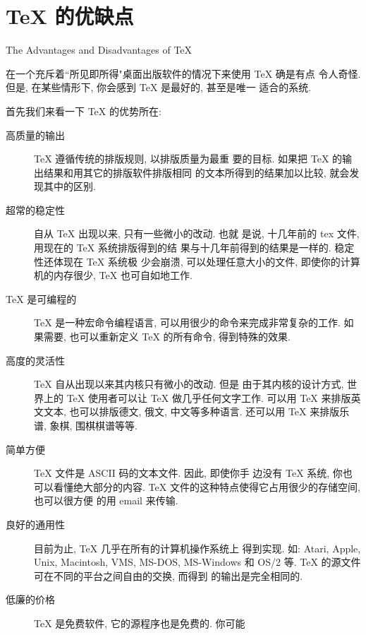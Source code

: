 \chapter{\TeX{} 的优缺点}{The Advantages and Disadvantages of \TeX}

在一个充斥着``所见即所得"桌面出版软件的情况下来使用 \TeX{} \index{\TeX} 确是有点
令人奇怪. 但是, 在某些情形下, 你会感到 \TeX{} \index{\TeX} 是最好的, 甚至是唯一
适合的系统.

首先我们来看一下 \TeX{} \index{\TeX} 的优势所在:

\begin{description}
  \item[高质量的输出] \TeX{} \index{\TeX} 遵循传统的排版规则, 以排版质量为最重
       要的目标. 如果把 \TeX{} \index{\TeX} 的输出结果和用其它的排版软件排版相同
       的文本所得到的结果加以比较, 就会发现其中的区别.
  \item[超常的稳定性] 自从 \TeX{} \index{\TeX} 出现以来, 只有一些微小的改动. 也就
       是说, 十几年前的 tex 文件, 用现在的 \TeX{} \index{\TeX}  系统排版得到的结
       果与十几年前得到的结果是一样的. 稳定性还体现在 \TeX{} \index{\TeX} 系统极
       少会崩溃, 可以处理任意大小的文件, 即使你的计算机的内存很少,
       \TeX{} \index{\TeX} 也可自如地工作.
  \item[\TeX{} 是可编程的] \TeX{} \index{\TeX} 是一种宏命令编程语言,
       可以用很少的命令来完成非常复杂的工作. 如果需要, 也可以重新定义
       \TeX{} \index{\TeX} 的所有命令, 得到特殊的效果.
  \item[高度的灵活性] \TeX{} \index{\TeX} 自从出现以来其内核只有微小的改动. 但是
       由于其内核的设计方式, 世界上的 \TeX{} \index{\TeX} 使用者可以让
       \TeX{} \index{\TeX} 做几乎任何文字工作. 可以用 \TeX{}\index{\TeX} 来排版英
       文文本, 也可以排版德文, 俄文, 中文等多种语言. 还可以用 \TeX{}\index{\TeX}
       来排版乐谱, 象棋, 围棋棋谱等等.
  \item[简单方便] \TeX{} \index{\TeX} 文件是 ASCII 码的文本文件. 因此, 即使你手
       边没有 \TeX{} \index{\TeX} 系统, 你也可以看懂绝大部分的内容.
       \TeX{} \index{\TeX} 文件的这种特点使得它占用很少的存储空间, 也可以很方便
       的用 email 来传输.
  \item[良好的通用性] 目前为止, \TeX{} \index{\TeX} 几乎在所有的计算机操作系统上
       得到实现. 如: Atari, Apple, Unix, Macintosh, VMS, MS-DOS, MS-Windows 和
       OS/2 等. \TeX{}\index{\TeX} 的源文件可在不同的平台之间自由的交换, 而得到
       的输出是完全相同的.
  \item[低廉的价格] \TeX{} \index{\TeX} 是免费软件, 它的源程序也是免费的. 你可能

\end{description}
